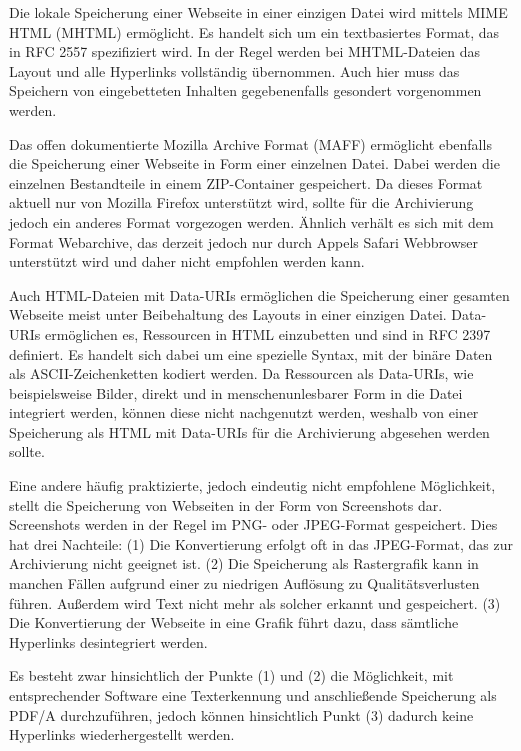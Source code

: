 Die lokale Speicherung einer Webseite in einer einzigen Datei wird mittels MIME HTML (MHTML) ermöglicht. Es handelt sich um ein textbasiertes Format, das in  RFC 2557 spezifiziert wird. In der Regel werden bei MHTML-Dateien das Layout und alle Hyperlinks vollständig übernommen. Auch hier muss das Speichern von eingebetteten Inhalten gegebenenfalls gesondert vorgenommen werden.

Das offen dokumentierte Mozilla Archive Format (MAFF) ermöglicht ebenfalls die Speicherung einer Webseite in Form einer einzelnen Datei. Dabei werden die einzelnen Bestandteile in einem ZIP-Container gespeichert. Da dieses Format aktuell nur von Mozilla Firefox unterstützt wird, sollte für die Archivierung jedoch ein anderes Format vorgezogen werden. Ähnlich verhält es sich mit dem Format Webarchive, das derzeit jedoch nur durch Appels Safari Webbrowser unterstützt wird und daher nicht empfohlen werden kann.

Auch HTML-Dateien mit Data-URIs ermöglichen die Speicherung einer gesamten Webseite meist unter Beibehaltung des Layouts in einer einzigen Datei. Data-URIs ermöglichen es, Ressourcen in HTML einzubetten und sind in RFC 2397 definiert. Es handelt sich dabei um eine spezielle Syntax, mit der binäre Daten als ASCII-Zeichenketten kodiert werden. Da Ressourcen als Data-URIs, wie beispielsweise Bilder,  direkt und in menschenunlesbarer Form in die Datei integriert werden, können diese nicht nachgenutzt werden, weshalb von einer Speicherung als HTML mit Data-URIs für die Archivierung abgesehen werden sollte.

Eine andere häufig praktizierte, jedoch eindeutig nicht empfohlene Möglichkeit, stellt die Speicherung von Webseiten in der Form von Screenshots dar. Screenshots werden in der Regel im PNG- oder JPEG-Format gespeichert. Dies hat drei Nachteile: (1) Die Konvertierung erfolgt oft in das JPEG-Format, das zur Archivierung nicht geeignet ist. (2) Die Speicherung als Rastergrafik kann in manchen Fällen aufgrund einer zu niedrigen Auflösung zu Qualitätsverlusten führen. Außerdem wird Text nicht mehr als solcher erkannt und gespeichert. (3) Die Konvertierung der Webseite in eine Grafik führt dazu, dass sämtliche Hyperlinks desintegriert werden.

Es besteht zwar hinsichtlich der Punkte (1) und (2) die Möglichkeit, mit entsprechender Software eine Texterkennung und anschließende Speicherung als PDF/A durchzuführen, jedoch können hinsichtlich Punkt (3) dadurch keine Hyperlinks wiederhergestellt werden. 


